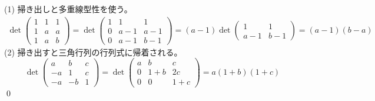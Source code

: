 \noindent (1) 掃き出しと多重線型性を使う。
\begin{align*}
\det
\begin{pmatrix}
1 & 1 & 1 \\
1 & a & a \\
1 & a & b
\end{pmatrix}
=
\det
\begin{pmatrix}
1 & 1 & 1 \\
0 & a - 1 & a - 1 \\
0 & a - 1 & b - 1
\end{pmatrix}
=
(a - 1) \det
\begin{pmatrix}
1 & 1 \\
a - 1 & b - 1
\end{pmatrix}
=
(a - 1)(b - a)
\end{align*}
\noindent (2) 掃き出すと三角行列の行列式に帰着される。
\[
\det
\begin{pmatrix}
a & b & c \\
-a & 1 & c \\
-a & -b & 1
\end{pmatrix}
=
\det
\begin{pmatrix}
a & b & c \\
0 & 1 + b & 2c \\
0 & 0 & 1 + c
\end{pmatrix}
= a(1 + b)(1 + c)
\]
\qed


